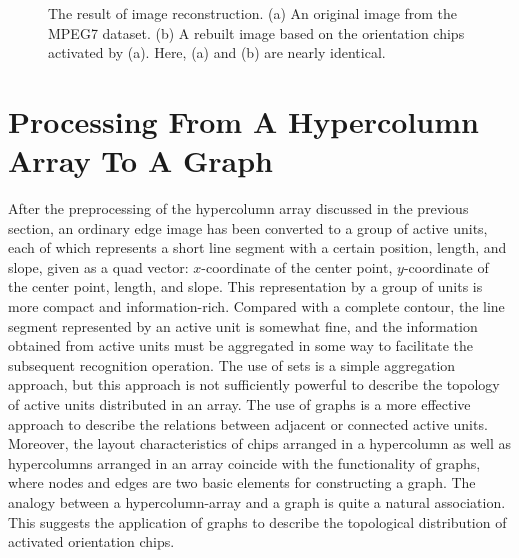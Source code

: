 \documentclass[journal]{IEEEtran}
\begin{document}
\begin{figure}[!t]
\centering
{}
\hfil
{}
\caption{The result of image reconstruction. (a) An original image from the MPEG7 dataset. (b) A rebuilt image based on the orientation chips activated by (a). Here, (a) and (b) are nearly identical.}
\label{fig:7}
\end{figure}

\section{Processing From A Hypercolumn Array To A Graph}

After the preprocessing of the hypercolumn array discussed in the previous section, 
an ordinary edge image has been converted to a group of active units, 
each of which represents a short line segment with a certain position, length, and slope, 
given as a quad vector: $x$-coordinate of the center point, 
$y$-coordinate of the center point, length, and slope. 
This representation by a group of units is more compact and information-rich. 
Compared with a complete contour, the line segment represented by an active unit is somewhat fine, 
and the information obtained from active units must be aggregated in some way to facilitate the subsequent recognition operation. 
The use of sets is a simple aggregation approach, 
but this approach is not sufficiently powerful to describe the topology of active units distributed in an array. 
The use of graphs is a more effective approach to describe the relations between adjacent or connected active units. 
Moreover, the layout characteristics of chips arranged in a hypercolumn as well as hypercolumns arranged in an array coincide with the functionality of graphs, 
where nodes and edges are two basic elements for constructing a graph. 
The analogy between a hypercolumn-array and a graph is quite a natural association. 
This suggests the application of graphs to describe the topological distribution of activated orientation chips.
\end{document}
